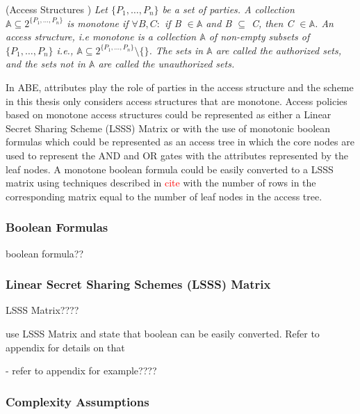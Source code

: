 \begin{definition}{(Access Structures \cite{Beimel1996})}
	\textit{Let $\{P_{1},\ldots,P_{n}\}$ be a set of parties. A collection $ \mathbb{A} \subseteq 2^{\{P_{1},\ldots,P_{n}\}} $ is monotone if $ \forall B,C\colon $ if B $ \in \mathbb{A} $ and B $ \subseteq $ C, then C $ \in \mathbb{A} $. An access structure, i.e monotone is a collection $ \mathbb{A} $ of non-empty subsets of $\{P_{1},\ldots,P_{n}\}$ i.e., $ \mathbb{A} \subseteq 2^{\{P_{1},\ldots,P_{n}\}}\setminus\{\} $. The sets in $ \mathbb{A} $ are called the authorized sets, and the sets not in $ \mathbb{A} $ are called the unauthorized sets.}
\end{definition}

In ABE, attributes play the role of parties in the access structure and the scheme in this thesis only considers access structures that are monotone. Access policies based on monotone access structures could be represented as either a Linear Secret Sharing Scheme (LSSS) Matrix or with the use of monotonic boolean formulas which could be represented as an access tree in which the core nodes are used to represent the AND and OR gates with the attributes represented by the leaf nodes. A monotone boolean formula could be easily converted to a LSSS matrix using techniques described in \textcolor{red}{cite} with the number of rows in the corresponding matrix equal to the number of leaf nodes in the access tree.

\subsubsection*{Boolean Formulas}

boolean formula??

\subsubsection*{Linear Secret Sharing Schemes (LSSS) Matrix}

LSSS Matrix????



use LSSS Matrix and state that boolean can be easily converted. Refer to appendix for details on that







- refer to appendix for example????



\subsubsection{Complexity Assumptions}

